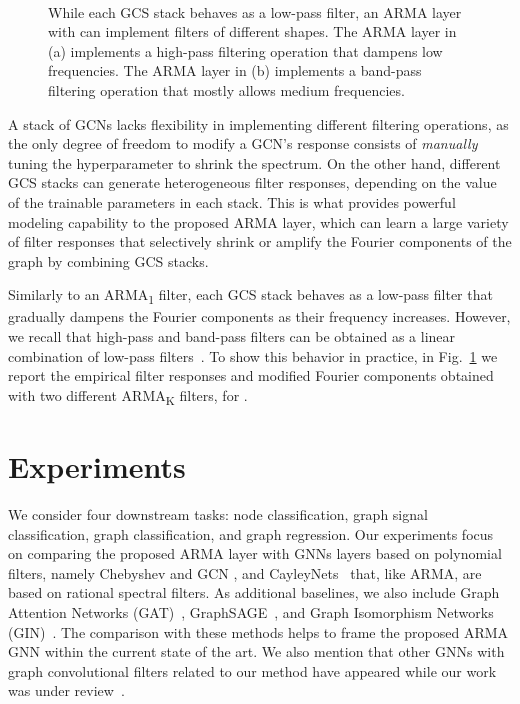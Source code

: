 \documentclass{article}
\begin{document}
\begin{figure}[!t]
	\centering
	~
	
    \caption{\footnotesize While each GCS stack behaves as a low-pass filter, an ARMA layer with  can implement filters of different shapes. 
    The ARMA layer in (a) implements a high-pass filtering operation that dampens low frequencies. 
    The ARMA layer in (b) implements a band-pass filtering operation that mostly allows medium frequencies.}
	\label{fig:filters2}
\end{figure}

A stack of GCNs lacks flexibility in implementing different filtering operations, as the only degree of freedom to modify a GCN's response consists of \textit{manually} tuning the hyperparameter  to shrink the spectrum.
On the other hand, different GCS stacks can generate heterogeneous filter responses, depending on the value of the trainable parameters in each stack.
This is what provides powerful modeling capability to the proposed ARMA layer, which can learn a large variety of filter responses that selectively shrink or amplify the Fourier components of the graph by combining  GCS stacks. 

Similarly to an ARMA\textsubscript{1} filter, each GCS stack behaves as a low-pass filter that gradually dampens the Fourier components as their frequency increases.
However, we recall that high-pass and band-pass filters can be obtained as a linear combination of low-pass filters~\cite{oppenheim2001discrete}.
To show this behavior in practice, in Fig.~\ref{fig:filters2} we report the empirical filter responses and modified Fourier components obtained with two different ARMA\textsubscript{K} filters, for .


\section{Experiments}
\label{sec:experiments}

We consider four downstream tasks: node classification, graph signal classification, graph classification, and graph regression.
Our experiments focus on comparing the proposed ARMA layer with GNNs layers based on polynomial filters, namely Chebyshev \cite{defferrard2016convolutional} and GCN \cite{kipf2016semi}, and CayleyNets~\cite{levie2017cayleynets} that, like ARMA, are based on rational spectral filters.
As additional baselines, we also include Graph Attention Networks (GAT)~\cite{velickovic2017graph}, GraphSAGE~\cite{hamilton2017inductive}, and Graph Isomorphism Networks (GIN)~\cite{xu2018powerful}.
The comparison with these methods helps to frame the proposed ARMA GNN within the current state of the art.
We also mention that other GNNs with graph convolutional filters related to our method have appeared while our work was under review~\cite{Ioannidis2020Pruned, NIPS2019_9016, zou2020graph, gao2019geometric}.
\end{document}
